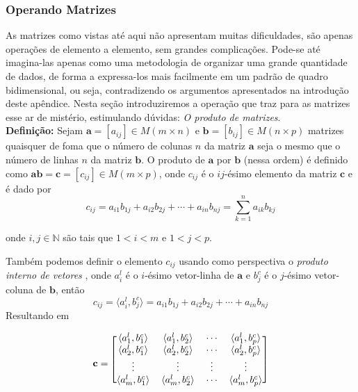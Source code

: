 \documentclass[a4paper,12pt]{article}
\begin{document}
	\subsubsection*{Operando Matrizes}
	As matrizes como vistas até aqui não apresentam muitas dificuldades, são apenas operações de elemento a elemento, sem grandes complicações. Pode-se até imagina-las apenas como uma metodologia de organizar uma grande quantidade de dados, de forma a expressa-los mais facilmente em um padrão de quadro bidimensional, ou seja, contradizendo os argumentos apresentados na introdução deste apêndice. Nesta seção introduziremos a operação que traz para as matrizes esse ar de mistério, estimulando dúvidas: \textit{O produto de matrizes}.
	\\ \newline \textbf{Definição:} Sejam $\mathbf{a} = [a_{ij}] \in M(m \times n)$ e $\mathbf{b} = [b_{ij}] \in M(n \times p)$ matrizes quaisquer de foma que o número de colunas $n$ da matriz $\mathbf{a}$ seja o mesmo que o número de linhas $n$ da matriz $\mathbf{b}$. O produto de $\mathbf{a}$ por $\mathbf{b}$ (nessa ordem) é definido como $\mathbf{ab} = \mathbf{c} = [c_{ij}] \in M(m \times p)$, onde $c_{ij}$ é o $ij$-ésimo elemento da matriz $\mathbf{c}$ e é dado por
	$$c_{ij} = a_{i1}b_{1j} + a_{i2}b_{2j} + \cdots + a_{in}b_{nj} = \sum_{k = 1}^{n}a_{ik}b_{kj}$$
	
	onde $i, j \in \mathbb{N}$ são tais que $1<i<m$ e $1<j<p$.
	
	Também podemos definir o elemento $c_{ij}$ usando como perspectiva o \textit{produto interno de vetores} \cite{AlgebraLinearElon}, onde $a_i^l$ é o $i$-ésimo vetor-linha de $\mathbf{a}$ e $b_j^c$ é o $j$-ésimo vetor-coluna de $\mathbf{b}$, então 
	$$c_{ij} = \langle a_i^l,b_j^c\rangle = a_{i1}b_{1j} + a_{i2}b_{2j} + \cdots + a_{in}b_{nj}$$
	Resultando em 
	
	\[\mathbf{c} =
	\begin{blockarray}{cccc}
	\begin{block}{[cccc]}
	\langle a_1^l,b_1^c\rangle & \langle a_1^l,b_2^c\rangle & \cdots & \langle a_1^l,b_p^c\rangle \\
	\langle a_2^l,b_1^c\rangle & \langle a_2^l,b_2^c\rangle & \cdots & \langle a_2^l,b_p^c\rangle \\
	\vdots & \vdots & \vdots & \vdots \\
	\langle a_m^l,b_1^c\rangle & \langle a_m^l,b_2^c\rangle & \cdots & \langle a_m^l,b_p^c\rangle \\
	\end{block}
	\end{blockarray}\]
	
\end{document}
